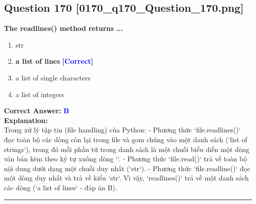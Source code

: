 \documentclass[11pt,a4paper]{article}
\begin{document}
\begin{minipage}{\textwidth}
\subsection*{Question 170 \quad \footnotesize{[0170_q170_Question_170.png]}}
\noindent \textbf{The readlines() method returns ...}

\begin{enumerate}[label=\Alph*.]
    \item str
    \item \textbf{a list of lines} \hfill \textcolor{blue}{\textbf{[Correct]}}
    \item a list of single characters
    \item a list of integers
\end{enumerate}

\noindent \textbf{Correct Answer:} \textcolor{blue}{\textbf{B}} \\[4pt]
\noindent \textbf{Explanation:}\\
Trong xử lý tập tin (file handling) của Python:\newline
- Phương thức `file.readlines()` đọc toàn bộ các dòng còn lại trong file và gom chúng vào một danh sách (`list of strings`), trong đó mỗi phần tử trong danh sách là một chuỗi biểu diễn một dòng văn bản kèm theo ký tự xuống dòng `\n`.\newline
- Phương thức `file.read()` trả về toàn bộ nội dung dưới dạng một chuỗi duy nhất (`str`).\newline
- Phương thức `file.readline()` đọc một dòng duy nhất và trả về kiểu `str`.\newline
Vì vậy, `readlines()` trả về một danh sách các dòng (`a list of lines` - đáp án B).
\end{minipage}
\vspace{0.8cm}
\hrule
\vspace{0.5cm}
\end{document}
